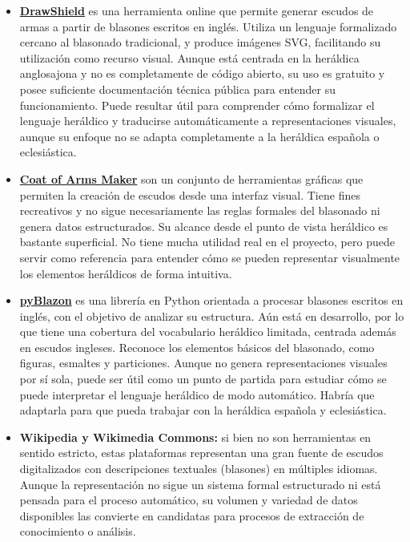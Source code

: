 \begin{itemize}
    \item \textbf{\href{https://drawshield.net/index.html}{DrawShield}} es una herramienta online que permite generar escudos de armas
    a partir de blasones escritos en inglés. Utiliza un lenguaje formalizado cercano al blasonado
    tradicional, y produce imágenes SVG, facilitando su utilización como recurso visual. Aunque está 
    centrada en la heráldica anglosajona y no es completamente de código abierto, su 
    uso es gratuito y posee suficiente documentación técnica pública para entender su 
    funcionamiento. Puede resultar útil para comprender cómo formalizar el lenguaje heráldico
    y traducirse automáticamente a representaciones visuales, aunque su enfoque no se adapta
    completamente a la heráldica española o eclesiástica.
    \item \textbf{\href{https://coamaker.com/}{Coat of Arms Maker}} son un conjunto de herramientas gráficas que permiten
    la creación de escudos desde una interfaz visual. Tiene fines recreativos y no sigue
    necesariamente las reglas formales del blasonado ni genera datos estructurados. Su alcance
    desde el punto de vista heráldico es bastante superficial. No tiene mucha utilidad real
    en el proyecto, pero puede servir como referencia para entender cómo se pueden representar
    visualmente los elementos heráldicos de forma intuitiva.
    \item \textbf{\href{https://web.meson.org/pyBlazon/}{pyBlazon}} es una librería en Python orientada a procesar blasones escritos en
    inglés, con el objetivo de analizar su estructura. Aún está en desarrollo, por lo que tiene
    una cobertura del vocabulario heráldico limitada, centrada además en escudos ingleses.
    Reconoce los elementos básicos del blasonado, como figuras, esmaltes y particiones.
    Aunque no genera representaciones visuales por sí sola, puede ser útil como un punto de partida
    para estudiar cómo se puede interpretar el lenguaje heráldico de modo automático. Habría que
    adaptarla para que pueda trabajar con la heráldica española y eclesiástica.
    \item \textbf{Wikipedia y Wikimedia Commons:} si bien no son herramientas en sentido estricto,
    estas plataformas representan una gran fuente de escudos digitalizados con descripciones
    textuales (blasones) en múltiples idiomas. Aunque la representación no sigue un sistema formal 
    estructurado ni está pensada para el proceso automático, su volumen y variedad de datos
    disponibles las convierte en candidatas para procesos de extracción de conocimiento o análisis.
\end{itemize}


